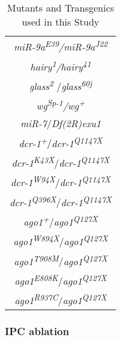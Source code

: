 \begin{table}[h!]
\centering
\caption{Mutants and Transgenics used in this Study}
\label{appendix:supp:metabolism:exp:alleles_table}
\begin{tabular}{c}
\hline
\textit{miR-9a\textsuperscript{E39}/miR-9a\textsuperscript{J22}} \\
\textit{hairy\textsuperscript{1}/hairy\textsuperscript{41}} \\
\textit{glass\textsuperscript{2 }}/\textit{glass\textsuperscript{60j}} \\
\textit{wg\textsuperscript{Sp-1}/wg\textsuperscript{+}} \\
\textit{miR-7\textsuperscript{\Delta1}}/\textit{Df(2R)exu1} \\
\textit{dcr-1\textsuperscript{+}}/\textit{dcr-1\textsuperscript{Q1147X}} \\
\textit{dcr-1\textsuperscript{K43X}}/\textit{dcr-1\textsuperscript{Q1147X}} \\
\textit{dcr-1\textsuperscript{W94X}}/\textit{dcr-1\textsuperscript{Q1147X}} \\
\textit{dcr-1\textsuperscript{Q396X}}/\textit{dcr-1\textsuperscript{Q1147X}} \\
\textit{ago1\textsuperscript{+}}/\textit{ago1\textsuperscript{Q127X}} \\
\textit{ago1\textsuperscript{W894X}}/\textit{ago1\textsuperscript{Q127X}} \\
\textit{ago1\textsuperscript{T908M}}/\textit{ago1\textsuperscript{Q127X}} \\
\textit{ago1\textsuperscript{E808K}}/\textit{ago1\textsuperscript{Q127X}} \\
\textit{ago1\textsuperscript{R937C}}/\textit{ago1\textsuperscript{Q127X}} \\
\end{tabular}
\end{table}

\subsubsection{IPC ablation}
\label{appendix:supp:metabolism:exp:ipc_ablation}


